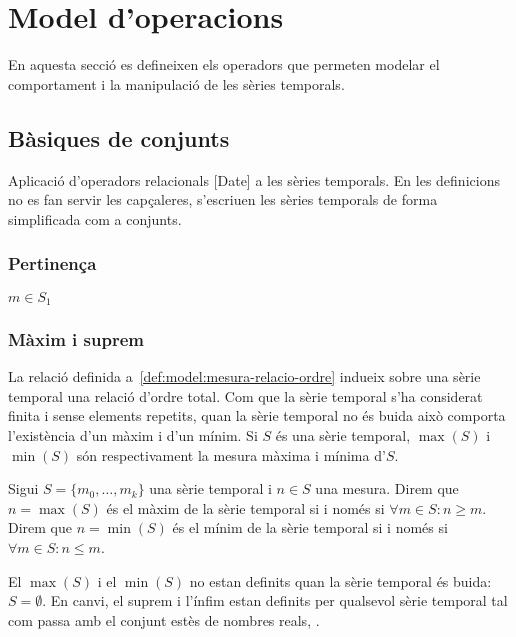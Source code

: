 \section{Model d'operacions}

En aquesta secció es defineixen els operadors que permeten modelar el
comportament i la manipulació de les sèries temporals.





\subsection{Bàsiques de conjunts}

Aplicació d'operadors relacionals [Date] a les sèries temporals.
En les definicions no es fan servir les capçaleres, s'escriuen les
sèries temporals de forma simplificada com a conjunts.



\subsubsection{Pertinença}


$ m \in S_1$


\subsubsection{Màxim i suprem}

La relació definida a~\ref{def:model:mesura-relacio-ordre} indueix
sobre una sèrie temporal una relació d'ordre total. Com que la sèrie
temporal s'ha considerat finita i sense elements repetits, quan la
sèrie temporal no és buida això comporta l'existència d'un màxim i
d'un mínim.  Si $S$ és una sèrie temporal, $\max(S)$ i $\min(S)$ són
respectivament la mesura màxima i mínima d'$S$.

\begin{definition}
  Sigui $S=\{m_0,\ldots,m_k\}$ una sèrie temporal i $n\in S$ una
  mesura.  Direm que $n=\max(S)$ és el màxim de la sèrie temporal si i
  només si $\forall m \in S: n \geq m $.  Direm que $n=\min(S)$ és el
  mínim de la sèrie temporal si i només si $\forall m \in S: n \leq
  m$.
\end{definition}

El $\max(S)$ i el $\min(S)$ no estan definits quan la sèrie temporal
és buida: $S= \emptyset$. En
canvi, el suprem i l'ínfim estan definits per qualsevol
sèrie temporal tal com passa amb el conjunt estès de nombres reals,
\cite{cantrell:extendedreal}.  

